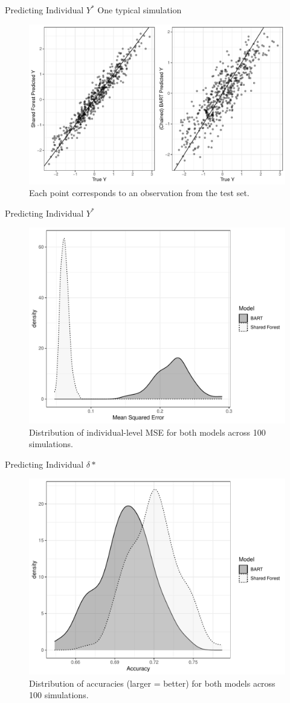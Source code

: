 \documentclass{beamer}
\begin{document}
\begin{frame}{Predicting Individual $Y^*$ }{One typical simulation}
\begin{figure}
\includegraphics[width = .7\linewidth]{continuous_sim_results_single_sim.pdf}
\caption{Each point corresponds to an observation from the test set. }
\end{figure}
\end{frame}

\begin{frame}{Predicting Individual $Y^*$ }
\begin{figure}
\includegraphics[width = .7\linewidth]{continuous_sim_results_ind_y.pdf}
\caption{Distribution of individual-level MSE for both models across 100 simulations.  }
\end{figure}
\end{frame}


\begin{frame}{Predicting Individual $\delta*$}
\begin{figure}
\includegraphics[width = .7\linewidth]{continuous_sim_results_ind_delta.pdf}
\caption{Distribution of accuracies (larger = better) for both models across 100 simulations.  }
\end{figure}
\end{frame}
\end{document}
